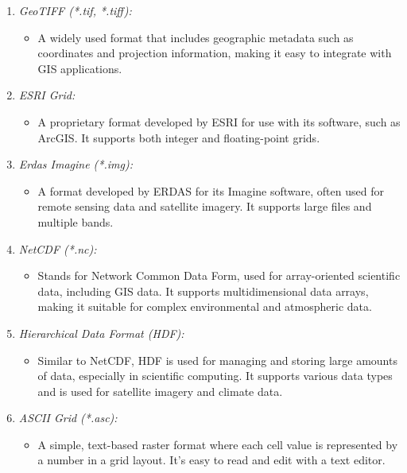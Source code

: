 \documentclass[
]{article}
\providecommand{\tightlist}{%
  \setlength{\itemsep}{0pt}\setlength{\parskip}{0pt}}
\begin{document}
\begin{enumerate}
\def\labelenumi{\arabic{enumi}.}
\tightlist
\item
  \emph{GeoTIFF (*.tif, *.tiff):}

  \begin{itemize}
  \tightlist
  \item
    A widely used format that includes geographic metadata such as coordinates and projection information, making it easy to integrate with GIS applications.
  \end{itemize}
\item
  \emph{ESRI Grid:}

  \begin{itemize}
  \tightlist
  \item
    A proprietary format developed by ESRI for use with its software, such as ArcGIS. It supports both integer and floating-point grids.
  \end{itemize}
\item
  \emph{Erdas Imagine (*.img):}

  \begin{itemize}
  \tightlist
  \item
    A format developed by ERDAS for its Imagine software, often used for remote sensing data and satellite imagery. It supports large files and multiple bands.
  \end{itemize}
\item
  \emph{NetCDF (*.nc):}

  \begin{itemize}
  \tightlist
  \item
    Stands for Network Common Data Form, used for array-oriented scientific data, including GIS data. It supports multidimensional data arrays, making it suitable for complex environmental and atmospheric data.
  \end{itemize}
\item
  \emph{Hierarchical Data Format (HDF):}

  \begin{itemize}
  \tightlist
  \item
    Similar to NetCDF, HDF is used for managing and storing large amounts of data, especially in scientific computing. It supports various data types and is used for satellite imagery and climate data.
  \end{itemize}
\item
  \emph{ASCII Grid (*.asc):}

  \begin{itemize}
  \tightlist
  \item
    A simple, text-based raster format where each cell value is represented by a number in a grid layout. It's easy to read and edit with a text editor.
  \end{itemize}
\end{enumerate}
\end{document}
